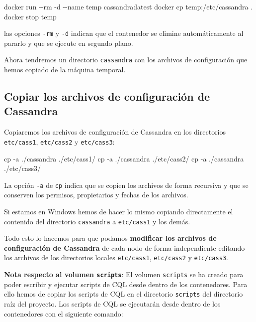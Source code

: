 \documentclass[
]{book}
\newenvironment{Shaded}{}{}
\newcommand{\AttributeTok}[1]{\textcolor[rgb]{0.49,0.56,0.16}{#1}}
\newcommand{\ExtensionTok}[1]{#1}
\newcommand{\FunctionTok}[1]{\textcolor[rgb]{0.02,0.16,0.49}{#1}}
\newcommand{\NormalTok}[1]{#1}
\begin{document}
\begin{Shaded}
\begin{Highlighting}[]
\ExtensionTok{docker}\NormalTok{ run }\AttributeTok{{-}{-}rm} \AttributeTok{{-}d} \AttributeTok{{-}{-}name}\NormalTok{ temp cassandra:latest}
\ExtensionTok{docker}\NormalTok{ cp temp:/etc/cassandra .}
\ExtensionTok{docker}\NormalTok{ stop temp}
\end{Highlighting}
\end{Shaded}

las opciones \texttt{-rm} y \texttt{-d} indican que el contenedor se elimine automáticamente al pararlo y que se ejecute en segundo plano.

Ahora tendremos un directorio \texttt{cassandra} con los archivos de configuración que hemos copiado de la máquina temporal.

\subsection{Copiar los archivos de configuración de Cassandra}\label{copiar-los-archivos-de-configuraciuxf3n-de-cassandra}

Copiaremos los archivos de configuración de Cassandra en los directorios \texttt{etc/cass1}, \texttt{etc/cass2} y \texttt{etc/cass3}:

\begin{Shaded}
\begin{Highlighting}[]
\FunctionTok{cp} \AttributeTok{{-}a}\NormalTok{ ./cassandra ./etc/cass1/}
\FunctionTok{cp} \AttributeTok{{-}a}\NormalTok{ ./cassandra ./etc/cass2/}
\FunctionTok{cp} \AttributeTok{{-}a}\NormalTok{ ./cassandra ./etc/cass3/}
\end{Highlighting}
\end{Shaded}

La opción \texttt{-a} de \texttt{cp} indica que se copien los archivos de forma recursiva y que se conserven los permisos, propietarios y fechas de los archivos.

Si estamos en Windows hemos de hacer lo mismo copiando directamente el contenido del directorio \texttt{cassandra} a \texttt{etc/cass1} y los demás.

Todo esto lo hacemos para que podamos \textbf{modificar los archivos de configuración de Cassandra} de cada nodo de forma independiente editando los archivos de los directorios locales \texttt{etc/cass1}, \texttt{etc/cass2} y \texttt{etc/cass3}.

\textbf{Nota respecto al volumen \texttt{scripts}}: El volumen \texttt{scripts} se ha creado para poder escribir y ejecutar scripts de CQL desde dentro de los contenedores. Para ello hemos de copiar los scripts de CQL en el directorio \texttt{scripts} del directorio raíz del proyecto. Los scripts de CQL se ejecutarán desde dentro de los contenedores con el siguiente comando:
\end{document}
